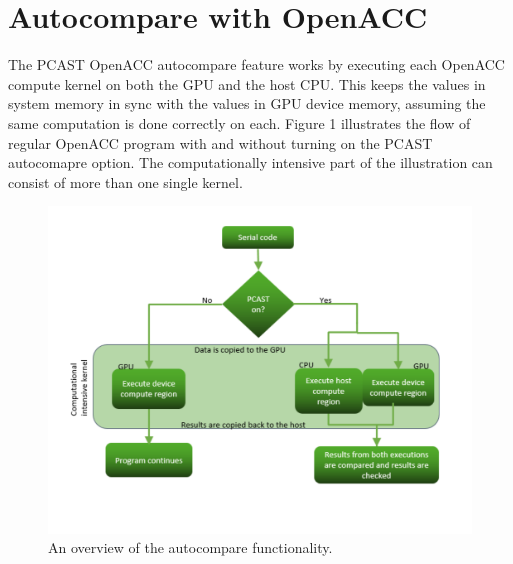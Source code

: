 \section{Autocompare with OpenACC}

The PCAST OpenACC autocompare feature works by executing each OpenACC compute kernel on both the GPU and the host CPU.
This keeps the values in system memory in sync with the values in GPU device memory, assuming the same computation is done correctly on each. Figure 1 illustrates the flow of regular OpenACC program with and without turning on the PCAST autocomapre option. The computationally intensive part of the illustration can consist of more than one single kernel.

\begin{figure}[t]
    \centering
    \includegraphics [width=1\linewidth] {flow_chart.pdf}
    \caption{An overview of the autocompare functionality.}
    \label{fig:cfg_figure}
\end{figure}


